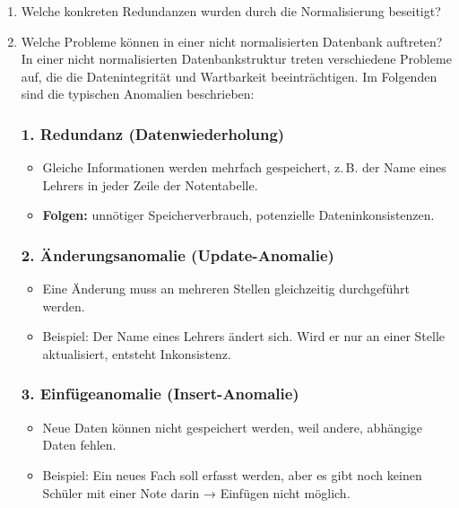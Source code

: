 \documentclass[a4paper,12pt]{article}
\begin{document}
\begin{enumerate}
		\item Welche konkreten Redundanzen wurden durch die Normalisierung beseitigt?
		\item Welche Probleme können in einer nicht normalisierten Datenbank auftreten?\\
		
		In einer nicht normalisierten Datenbankstruktur treten verschiedene Probleme auf, die die Datenintegrität und Wartbarkeit beeinträchtigen. Im Folgenden sind die typischen Anomalien beschrieben:
		
		\subsubsection*{1. Redundanz (Datenwiederholung)}
		
		\begin{itemize}
			\item Gleiche Informationen werden mehrfach gespeichert, z.\,B. der Name eines Lehrers in jeder Zeile der Notentabelle.
			\item \textbf{Folgen:} unnötiger Speicherverbrauch, potenzielle Dateninkonsistenzen.
		\end{itemize}
		
		\vspace{0.5em}
		
		\subsubsection*{2. Änderungsanomalie (Update-Anomalie)}
		
		\begin{itemize}
			\item Eine Änderung muss an mehreren Stellen gleichzeitig durchgeführt werden.
			\item Beispiel: Der Name eines Lehrers ändert sich. Wird er nur an einer Stelle aktualisiert, entsteht Inkonsistenz.
		\end{itemize}
		
		\vspace{0.5em}
		
		\subsubsection*{3. Einfügeanomalie (Insert-Anomalie)}
		
		\begin{itemize}
			\item Neue Daten können nicht gespeichert werden, weil andere, abhängige Daten fehlen.
			\item Beispiel: Ein neues Fach soll erfasst werden, aber es gibt noch keinen Schüler mit einer Note darin → Einfügen nicht möglich.
		\end{itemize}
		

\end{enumerate}
\end{document}
